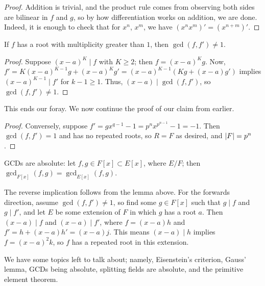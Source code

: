 \begin{proof}
    Addition is trivial, and the product rule comes from observing both sides are bilinear in $f$ and $g$, so by how differentiation works on addition, we are done. Indeed, it is enough to check that for $x^n$, $x^m$, we have $(x^n x^m)' = (x^{n+m})'$.
\end{proof}
\begin{lemma}
    If $f$ has a root with multiplicity greater than $1$, then $\gcd(f, f') \neq 1$.
\end{lemma}
\begin{proof}
    Suppose $(x - a)^K \mid f$ with $K \geq 2$; then $f = (x - a)^K g$. Now, $f' = K(x - a)^{K-1} g + (x - a)^K g' = (x - a)^{K-1} (Kg + (x - a)g')$ implies $(x - a)^{K-1} \mid f'$ for $k - 1 \geq 1$. Thus, $(x - a) \mid \gcd(f, f')$, so $\gcd(f, f') \neq 1$.
\end{proof}
This ends our foray. We now continue the proof of our claim from earlier.
\begin{proof}
    Conversely, suppose $f' = gx^{q-1} - 1 = p^n x^{p^{n-1}} - 1 = -1$. Then $\gcd(f, f') = 1$ and has no repeated roots, so $R = F$ as desired, and $\left\lvert F \right\rvert = p^n$.
\end{proof}
\begin{lemma}
    GCDs are absolute: let $f, g \in F[x] \subset E[x]$, where $E/F$; then\\ $\gcd_{F[x]} (f, g) = \gcd_{E[x]} (f, g)$.
\end{lemma}
\begin{proposition}
    The reverse implication follows from the lemma above. For the forwards direction, assume $\gcd(f, f') \neq 1$, so find some $g \in F[x]$ such that $g \mid f$ and $g \mid f'$, and let $E$ be some extension of $F$ in which $g$ has a root $a$. Then $(x - a) \mid f$ and $(x - a) \mid f'$, where $f = (x - a) h$ and $f' = h + (x - a) h' = (x - a) j$. This means $(x - a) \mid h$ implies $f = (x - a)^2 k$, so $f$ has a repeated root in this extension.
\end{proposition}
We have some topics left to talk about; namely, Eisenstein's criterion, Gauss' lemma, GCDs being absolute, splitting fields are absolute, and the primitive element theorem.
